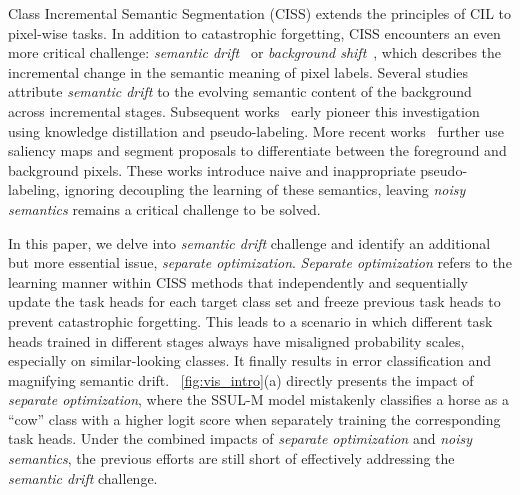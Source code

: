 Class Incremental Semantic Segmentation (CISS) extends the principles of CIL to pixel-wise tasks.
In addition to catastrophic forgetting, CISS encounters an even more critical challenge: \textit{semantic drift}~\citep{CISS_survey_yuan2023survey} or \textit{background shift}~\citep{MiB_cermelli2020modeling}, which describes the incremental change in the semantic meaning of pixel labels. 
Several studies~\citep{PLOP_douillard2021plop, SSUL_cha2021ssul, microseg_zhang2022mining, coinseg_zhang2023coinseg} attribute \textit{semantic drift}
to the evolving semantic content of the background across incremental stages.
Subsequent works~\citep{MiB_cermelli2020modeling, PLOP_douillard2021plop} early pioneer this investigation using knowledge distillation and pseudo-labeling. 
More recent works~\citep{SSUL_cha2021ssul, microseg_zhang2022mining, coinseg_zhang2023coinseg} further use saliency maps and segment proposals to differentiate between the foreground and background pixels. 
These works introduce naive and inappropriate pseudo-labeling, ignoring decoupling the learning of these semantics, leaving \textit{noisy semantics} remains a critical challenge to be solved.

In this paper, we delve into \textit{semantic drift} challenge and identify an additional but more essential issue, \textit{separate optimization}.
\textit{Separate optimization} refers to the learning manner within CISS methods that independently and sequentially update the task heads for each target class set and freeze previous task heads to prevent catastrophic forgetting.
This leads to a scenario in which different task heads trained in different stages always have misaligned probability scales, especially on similar-looking classes. It finally results in error classification and magnifying semantic drift.
~\cref{fig:vis_intro}(a) directly presents the impact of \textit{separate optimization}, where the SSUL-M model mistakenly classifies a horse as a ``cow'' class with a higher logit score when separately training the corresponding task heads.
Under the combined impacts of \textit{separate optimization} and \textit{noisy semantics}, the previous efforts are still short of effectively addressing the \textit{semantic drift} challenge.




